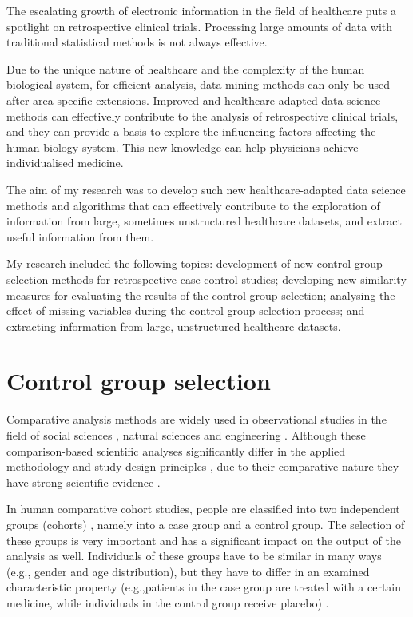 The escalating growth of electronic information in the field of healthcare puts a spotlight on retrospective clinical trials. Processing large amounts of data with traditional statistical methods is not always effective.


Due to the unique nature of healthcare and the complexity of the human biological system, for efficient analysis, data mining methods can only be used after area-specific extensions. Improved and healthcare-adapted data science methods can effectively contribute to the analysis of retrospective clinical trials, and they can provide a basis to explore the influencing factors affecting the human biology system. This new knowledge can help physicians achieve individualised medicine.

The aim of my research was to develop such new healthcare-adapted data science methods and algorithms that can effectively contribute to the exploration of information from large, sometimes unstructured healthcare datasets, and extract useful information from them.

My research included the following topics: development of new control group selection methods for retrospective case-control studies; developing new similarity measures for evaluating the results of the control group selection; analysing the effect of missing variables during the control group selection process; and extracting information from large, unstructured healthcare datasets.

\section{Control group selection}
\label{sec:cgs_intro}

Comparative analysis methods are widely used in observational studies in the field of social sciences \cite{rasoolimanesh2023guideline}, natural sciences \cite{zeng2023comparative} and engineering \cite{abualigah2022meta}. Although these comparison-based scientific analyses significantly differ in the applied methodology and study design principles \cite{song2010observational, wacholder1992selection3}, due to their comparative nature they have strong scientific evidence \cite{horton2011encyclopaedic, zschoch2011configurational, pickvance2001four, wacholder1992selection,wacholder1992selection2}.

In human comparative cohort studies, people are classified into two independent groups (cohorts) \cite{wacholder1992selection}, namely into a case group and a control group. The selection of these groups is very important and has a significant impact on the output of the analysis as well. Individuals of these groups have to be similar in many ways (e.g., gender and age distribution), but they have to differ in an examined characteristic property (e.g.,patients in the case group are treated with a certain medicine, while individuals in the control group receive placebo) \cite{wacholder1992selection, wacholder1992selection2, iwagami2022introduction}.

